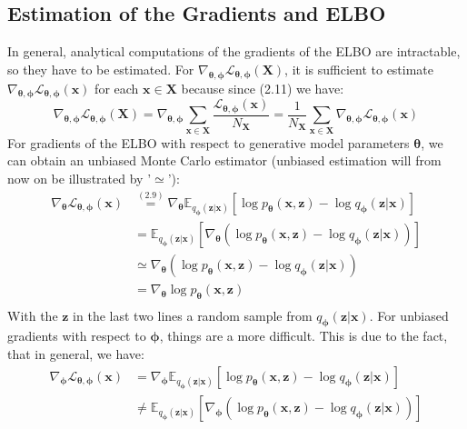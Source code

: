 \documentclass[12pt]{report}
\theoremstyle{definition}
\begin{document}
\subsection{Estimation of the Gradients and ELBO}
In general, analytical computations of the gradients of the ELBO are intractable, so they have to be estimated. For $\nabla_{\pmb{\theta}, \pmb{\phi}}\mathcal{L}_{\pmb{\theta}, \pmb{\phi}}(\mathbf{X})$, it is sufficient to estimate $\nabla_{\pmb{\theta}, \pmb{\phi}}\mathcal{L}_{\pmb{\theta}, \pmb{\phi}}(\mathbf{x})$ for each $\mathbf{x} \in \mathbf{X}$ because since (2.11) we have:
\begin{equation}
	\nabla_{\pmb{\theta}, \pmb{\phi}}\mathcal{L}_{\pmb{\theta}, \pmb{\phi}}(\mathbf{X}) = \nabla_{\pmb{\theta}, \pmb{\phi}}  \sum_{\mathbf{x} \in \mathbf{X}} \frac{\mathcal{L}_{\pmb{\theta}, \pmb{\phi}}(\mathbf{x})}{N_{\mathbf{X}}} = \frac{1}{N_{\mathbf{X}}} \sum_{\mathbf{x} \in \mathbf{X}} \nabla_{\pmb{\theta}, \pmb{\phi}} \mathcal{L}_{\pmb{\theta}, \pmb{\phi}}(\mathbf{x})
\end{equation}
For gradients of the ELBO with respect to generative model parameters $\pmb{\theta}$, we can obtain an unbiased Monte Carlo estimator (unbiased estimation will from now on be illustrated by '$\simeq$'):
\begin{equation}
\begin{split}
\nabla_{\pmb{\theta}}\mathcal{L}_{\pmb{\theta}, \pmb{\phi}}(\mathbf{x})
& \stackrel{(2.9)}{=} \nabla_{\pmb{\theta}} \mathbb{E}_{q_{\pmb{\phi}}(\mathbf{z}|\mathbf{x})}\left[ \log p_{\pmb{\theta}}(\mathbf{x}, \mathbf{z}) - \log q_{\pmb{\phi}}(\mathbf{z}|\mathbf{x}) \right]	\\
& = \mathbb{E}_{q_{\pmb{\phi}}(\mathbf{z}|\mathbf{x})}\left[ \nabla_{\pmb{\theta}} (\log p_{\pmb{\theta}}(\mathbf{x}, \mathbf{z}) - \log q_{\pmb{\phi}}(\mathbf{z}|\mathbf{x})) \right] \\
& \simeq \nabla_{\pmb{\theta}} (\log p_{\pmb{\theta}}(\mathbf{x}, \mathbf{z}) - \log q_{\pmb{\phi}}(\mathbf{z}|\mathbf{x})) \\
& = \nabla_{\pmb{\theta}} \log p_{\pmb{\theta}}(\mathbf{x}, \mathbf{z})\\
\end{split}
\end{equation}
With the $\mathbf{z}$ in the last two lines a random sample from $q_{\pmb{\phi}}(\mathbf{z}|\mathbf{x})$. For unbiased gradients with respect to $\pmb{\phi}$, things are a more difficult. This is due to the fact, that in general, we have:
\begin{equation}
\begin{split}
\nabla_{\pmb{\phi}}\mathcal{L}_{\pmb{\theta}, \pmb{\phi}}(\mathbf{x})
& = \nabla_{\pmb{\phi}} \mathbb{E}_{q_{\pmb{\phi}}(\mathbf{z}|\mathbf{x})}\left[ \log p_{\pmb{\theta}}(\mathbf{x}, \mathbf{z}) - \log q_{\pmb{\phi}}(\mathbf{z}|\mathbf{x}) \right]	\\
& \neq \mathbb{E}_{q_{\pmb{\phi}}(\mathbf{z}|\mathbf{x})}\left[ \nabla_{\pmb{\phi}} (\log p_{\pmb{\theta}}(\mathbf{x}, \mathbf{z}) - \log q_{\pmb{\phi}}(\mathbf{z}|\mathbf{x})) \right] \\
\end{split}
\end{equation}
\end{document}
